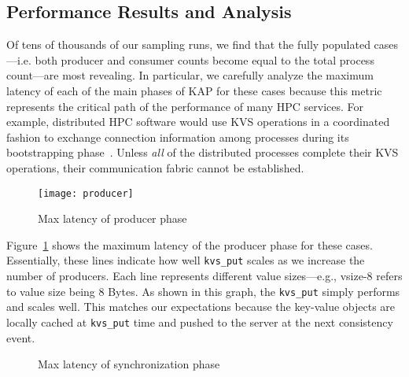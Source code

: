 \subsection{Performance Results and Analysis}
\label{results}
Of tens of thousands of our sampling runs, we find that the fully populated
cases---i.e. both producer and consumer counts become equal to the total
process count---are most revealing. In particular, we carefully analyze 
the maximum latency of each of the main phases of KAP for these cases 
because this metric represents the critical path of the performance of
many HPC services. For example, distributed 
HPC software would use KVS operations in a coordinated fashion to exchange 
connection information among processes during its bootstrapping 
phase~\cite{LIBI,PMI2}. Unless {\em all} 
of the distributed processes complete their
KVS operations, their communication fabric cannot be established. 

\begin{figure}
  \centering
  \texttt{[image: producer]}
  \caption{Max latency of producer phase}
  \vspace{-.5cm}	
  \label{fig:prod}
\end{figure}

Figure~\ref{fig:prod} shows the maximum latency of the producer phase
for these cases. Essentially, these lines indicate how well {\tt kvs\_put}
scales as we increase the number of producers. Each line represents
different value sizes---e.g., vsize-8 refers to value size being
8 Bytes. As shown in this graph, the {\tt kvs\_put} simply performs and
scales well. This matches our expectations because the key-value objects
are locally cached at {\tt kvs\_put} time and pushed to the
server at the next consistency event. 

\ifcomments
{}

\begin{figure}[ht]
\centering
\begin{subfigure}[With unique values]{
  \texttt{[image: sync]}
  \label{fig:sync:noredund}
}%
\end{subfigure}
\begin{subfigure}[With redundant values]{
  \texttt{[image: sync]}
  \label{fig:sync:redund}
}%
\end{subfigure}
\caption{Max latency of synchronization phase}
\label{fig:sync}
\end{figure}



